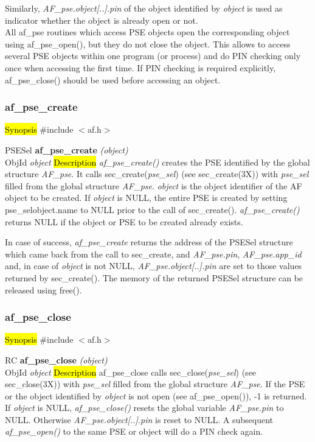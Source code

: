 Similarly, {\em AF\_pse.object[..].pin} of the object identified by {\em object} is used as
indicator whether the object is already open or not.
\\ [1em]
All af\_pse routines which access PSE objects
open the corresponding object using af\_pse\_open(), but they do not
close the object. This allows to access several PSE objects within one program (or process)
and do PIN checking only once when accessing the first time. If PIN checking is required explicitly,
af\_pse\_close() should be used before accessing an object.

\subsubsection{af\_pse\_create}
\label{af_pse_create}
\hl{Synopsis}
\#include $<$af.h$>$

PSESel {\bf *af\_pse\_create} {\em (object)} \\
ObjId {\em *object}
\hl{Description}
{\em af\_pse\_create()} creates the PSE identified by the global structure {\em AF\_pse}.
It calls sec\_create({\em pse\_sel}) (see sec\_create(3X)) 
with {\em pse\_sel} filled from the global structure {\em AF\_pse}.
{\em object} is the object identifier of the AF object to be created.
If {\em object} is NULL, the entire PSE is created by setting pse\_sel\pf object.name
to NULL prior to the call of sec\_create().
{\em af\_pse\_create()} returns NULL if the object or PSE to be created already exists.
 
In case of success, {\em af\_pse\_create} returns the address of the PSESel structure which came back from
the call to sec\_create, and {\em AF\_pse.pin}, {\em AF\_pse.app\_id} and, in case of
{\em object} is not NULL, {\em AF\_pse.object[..].pin} are set to those values returned
by sec\_create(). The memory of the returned PSESel structure can be released using free().

\subsubsection{af\_pse\_close}
\label{af_sc_close}
\hl{Synopsis}
\#include $<$af.h$>$ 

RC {\bf af\_pse\_close} {\em (object)} \\
ObjId {\em *object}
\hl{Description}
af\_pse\_close calls sec\_close({\em pse\_sel}) (see sec\_close(3X)) 
with {\em pse\_sel} filled from the global structure {\em AF\_pse}. If the PSE
or the object identified by {\em object} is not open (see af\_pse\_open()), -1 is returned.
If {\em object} is NULL, {\em af\_pse\_close()} resets the global variable {\em AF\_pse.pin} to NULL.
Otherwise {\em AF\_pse.object[..].pin} is reset to NULL. A subsequent {\em af\_pse\_open()}
to the same PSE or object will do a PIN check again.

